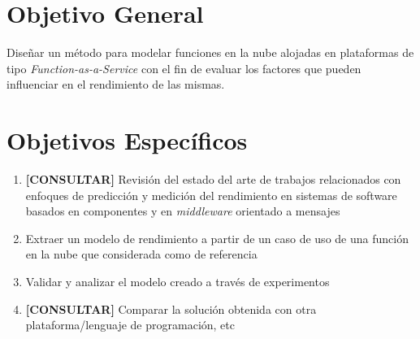 \section{Objetivo General}
Diseñar un método para modelar funciones en la nube alojadas en plataformas de tipo \emph{Function-as-a-Service} con el fin de evaluar los factores que pueden influenciar en el rendimiento de las mismas. 

\section{Objetivos Específicos}
\begin{enumerate}
    \item \textbf{[CONSULTAR]} Revisión del estado del arte de trabajos relacionados con enfoques de predicción y medición del rendimiento en sistemas de software basados en componentes y en \emph{middleware} orientado a mensajes
    \item Extraer un modelo de rendimiento a partir de un caso de uso de una función en la nube que considerada como de referencia
    \item Validar y analizar el modelo creado a través de experimentos
    \item \textbf{[CONSULTAR]} Comparar la solución obtenida con otra plataforma/lenguaje de programación, etc
\end{enumerate}


